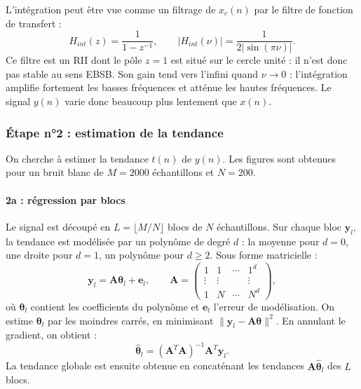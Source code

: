 \documentclass[11pt,a4paper]{article}
\begin{document}
L'intégration peut être vue comme un filtrage de $x_c(n)$ par le filtre de fonction de transfert :
\begin{equation}
  H_{int}(z) = \frac{1}{1 - z^{-1}},
  \qquad
  \left|H_{int}(\nu)\right| = \frac{1}{2\left|\sin(\pi\nu)\right|}.
  \label{eq:Hint}
\end{equation}
Ce filtre est un RII dont le pôle $z = 1$ est situé sur le cercle unité : il n'est donc pas
stable au sens EBSB. Son gain tend vers l'infini quand $\nu \to 0$ : l'intégration amplifie
fortement les basses fréquences et atténue les hautes fréquences. Le signal $y(n)$ varie donc
beaucoup plus lentement que $x(n)$.

\subsubsection{Étape n°2 : estimation de la tendance}

On cherche à estimer la tendance $t(n)$ de $y(n)$. Les
figures sont obtenues pour un bruit blanc de $M = 2000$ échantillons et $N = 200$.

\paragraph{2a : régression par blocs}

Le signal est découpé en $L = \lfloor M/N \rfloor$ blocs de $N$ échantillons. Sur chaque
bloc $\mathbf{y}_l$, la tendance est modélisée par un polynôme de degré $d$ : la moyenne
pour $d = 0$, une droite pour $d = 1$, un polynôme pour $d \geq 2$. Sous forme matricielle :
\begin{equation}
  \mathbf{y}_l = \mathbf{A}\boldsymbol{\theta}_l + \mathbf{e}_l,
  \qquad
  \mathbf{A} =
  \begin{pmatrix}
    1 & 1 & \cdots & 1^d \\
    \vdots & \vdots & & \vdots \\
    1 & N & \cdots & N^d
  \end{pmatrix},
\end{equation}
où $\boldsymbol{\theta}_l$ contient les coefficients du polynôme et $\mathbf{e}_l$ l'erreur
de modélisation. On estime $\boldsymbol{\theta}_l$ par les moindres carrés, en minimisant
$\|\mathbf{y}_l - \mathbf{A}\boldsymbol{\theta}\|^2$. En annulant le gradient, on obtient :
\begin{equation}
  \hat{\boldsymbol{\theta}}_l = \left(\mathbf{A}^T\mathbf{A}\right)^{-1}\mathbf{A}^T\mathbf{y}_l .
  \label{eq:mc}
\end{equation}
La tendance globale est ensuite obtenue en concaténant les tendances
$\mathbf{A}\hat{\boldsymbol{\theta}}_l$ des $L$ blocs.
\end{document}

